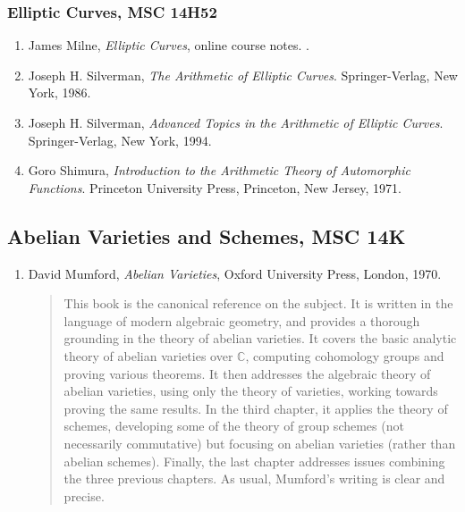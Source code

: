 \documentclass[12pt]{article}
\begin{document}
\subsubsection*{Elliptic Curves, MSC 14H52}
\begin{enumerate}

\item James Milne, \emph{Elliptic Curves}, online course notes. .

\item Joseph H. Silverman, \emph{The Arithmetic of Elliptic Curves}. Springer-Verlag, New York, 1986.

\item Joseph H. Silverman, \emph{Advanced Topics in
the Arithmetic of Elliptic Curves}. Springer-Verlag, New York, 1994.

\item Goro Shimura, \emph{Introduction to the
Arithmetic Theory of Automorphic Functions}. Princeton University
Press, Princeton, New Jersey, 1971.

\end{enumerate}

\subsection*{Abelian Varieties and Schemes, MSC 14K}
\begin{enumerate}
\item David Mumford, \emph{Abelian Varieties}, Oxford University Press, London, 1970.
\begin{quote} 
This book is the canonical reference on the subject.  It is written in the language of modern algebraic geometry, and provides a thorough grounding in the theory of abelian varieties.  It covers the basic analytic theory of abelian varieties over $\mathbb{C}$, computing cohomology groups and proving various theorems.  It then addresses the algebraic theory of abelian varieties, using only the theory of varieties, working towards proving the same results.  In the third chapter, it applies the theory of schemes, developing some of the theory of group schemes (not necessarily commutative) but focusing on abelian varieties (rather than abelian schemes).  Finally, the last chapter addresses issues combining the three previous chapters.  As usual, Mumford's writing is clear and precise. 
\end{quote}

\end{enumerate}
\end{document}
